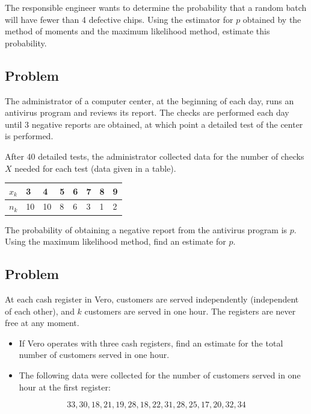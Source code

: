 \documentclass[a4paper, 12pt]{article}
\begin{document}
The responsible engineer wants to determine the probability that a random batch will have fewer than 4 defective chips. Using the estimator for $p$ obtained by the method of moments and the maximum likelihood method, estimate this probability.

\subsection{Problem}
The administrator of a computer center, at the beginning of each day, runs an antivirus program and reviews its report. The checks are performed each day until 3 negative reports are obtained, at which point a detailed test of the center is performed.

After 40 detailed tests, the administrator collected data for the number of checks $X$ needed for each test (data given in a table).

\begin{table}[h!]
\centering
\begin{tabular}{|l|l|l|l|l|l|l|l|}
\hline
$x_k$ & 3  & 4  & 5 & 6 & 7 & 8 & 9 \\ \hline
$n_k$ & 10 & 10 & 8 & 6 & 3 & 1 & 2 \\ \hline
\end{tabular}
\end{table}

The probability of obtaining a negative report from the antivirus program is $p$. Using the maximum likelihood method, find an estimate for $p$.

\subsection{Problem}
At each cash register in Vero, customers are served independently (independent of each other), and $k$ customers are served in one hour. The registers are never free at any moment.
\begin{itemize}
  
\item [a)] If Vero operates with three cash registers, find an estimate for the total number of customers served in one hour.

\item [b)] The following data were collected for the number of customers served in one hour at the first register:
\end{itemize}

\[
33, 30, 18, 21, 19, 28, 18, 22, 31, 28, 25, 17, 20, 32, 34
\]
\end{document}

